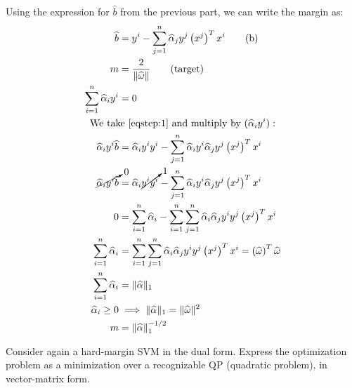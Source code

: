 \begin{exercise}[breakable]{}{}
\begin{enumerate}
      Using the expression for $\widehat b$ from the previous part, we can
      write the margin as:
		      \begin{align*}
            \widehat{b}   & = y^i - \sum_{j=1}^n \widehat\alpha_j y^j \left(x^j\right)^T x^i \label{eqstep:1}\tag{b} \\
            m &= \frac{2}{\lVert \widehat\omega \rVert} \tag{target}\\
            \sum_{i=1}^n \widehat\alpha_i y^i &= 0 \\
            \span\text{We take \cref{eqstep:1} and multiply by } (\widehat\alpha_iy^i): \\
            \widehat\alpha_iy^i \widehat b &= \widehat\alpha_iy^i y^i - \sum_{j=1}^n \widehat\alpha_iy^i \widehat\alpha_j y^j \left(x^j\right)^T x^i \\
            \cancelto{0}{\widehat\alpha_iy^i \widehat b} &=
            \widehat\alpha_i \cancelto{1}{y^i y^i} - \sum_{j=1}^n \widehat\alpha_iy^i \widehat\alpha_j y^j \left(x^j\right)^T x^i \\
            0 &= \sum_{i=1}^n \widehat\alpha_i
            - \sum_{i=1}^n \sum_{j=1}^n \widehat\alpha_i \widehat\alpha_j y^i y^j \left(x^j\right)^T x^i \\
            \sum_{i=1}^n \widehat\alpha_i &= \sum_{i=1}^n \sum_{j=1}^n \widehat\alpha_i \widehat\alpha_j y^i y^j \left(x^j\right)^T x^i = \left(\widehat\omega\right)^T \widehat\omega \\
            \sum_{i=1}^n \widehat\alpha_i &= \lVert \widehat\alpha \rVert_1 \\
            \widehat\alpha_i \geq 0 &\implies \lVert \widehat\alpha \rVert_1 = \lVert \widehat\omega \rVert^2 \\
            m &= \lVert \widehat\alpha \rVert_1^{-1/2}
		      \end{align*}
	\end{enumerate}
\end{exercise}

\begin{exercise}{}{}
	Consider again a hard-margin SVM in the dual form. Express
	the optimization problem as a minimization over a
	recognizable QP (quadratic problem), in vector-matrix form.
\end{exercise}

